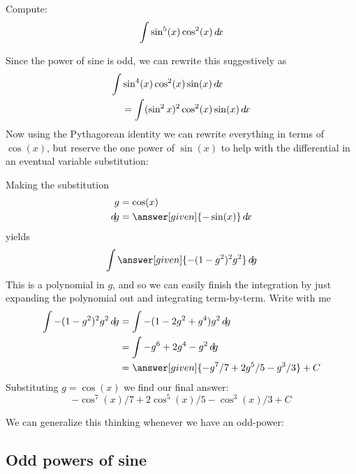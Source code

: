 \documentclass{ximera}
\begin{document}
\begin{example}
  Compute:
  \[
  \int \sin^5(x) \cos^2(x) \mathop{}\!d\! x
  \]
  \begin{explanation}
    Since the power of sine is odd, we can rewrite this suggestively as
    \begin{align*}
    \int &\sin^4(x) \cos^2(x) \sin(x) \mathop{}\!d\! x \\
    &= \int (\sin^2x)^2 \cos^2(x) \sin(x) \mathop{}\!d\! x
    \end{align*}
    Now using the Pythagorean identity we can rewrite everything in
    terms of $\cos(x)$, but reserve the one power of $\sin(x)$ to help
    with the differential in an eventual variable substitution:
    \begin{center}%
    \end{center}
    Making the substitution
    \begin{align*}
      g &= \cos(x)\\
      \d g &=\answer[given]{-\sin(x)} \d x
    \end{align*}
    yields
    \[
    \int \answer[given]{-(1-g^2)^2 g^2} \d g
    \]
    This is a polynomial in $g$, and so we can easily finish the
    integration by just expanding the polynomial out and integrating
    term-by-term. Write with me
    \begin{align*}
      \int {-(1-g^2)^2 g^2} \d g &= \int -(1-2g^2+g^4)g^2\d g\\
      &= \int-g^6 + 2g^4-g^2 \d g\\
      &=\answer[given]{-g^7/7 + 2g^5/5 - g^3/3}+C
    \end{align*}
    Substituting $g = \cos(x)$ we find our final answer:
    \[
    -\cos^7(x)/7 + 2\cos^5(x)/5 - \cos^3(x)/3+C
    \]
  \end{explanation}
\end{example}

We can generalize this thinking whenever we have an odd-power:

\subsection{Odd powers of sine}
\end{document}
